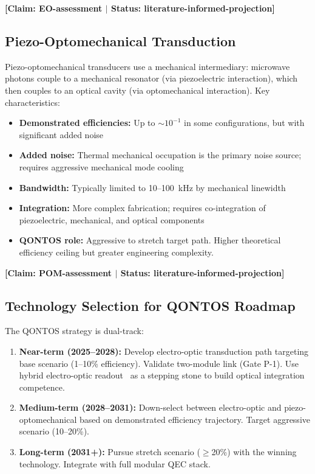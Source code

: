 \documentclass[conference]{IEEEtran}
\begin{document}
\textbf{[Claim: EO-assessment $|$ Status: literature-informed-projection]}

\subsection{Piezo-Optomechanical Transduction}

Piezo-optomechanical transducers use a mechanical intermediary: microwave photons couple to a mechanical resonator (via piezoelectric interaction), which then couples to an optical cavity (via optomechanical interaction). Key characteristics:

\begin{itemize}
\item \textbf{Demonstrated efficiencies:} Up to $\sim$$10^{-1}$ in some configurations, but with significant added noise~\cite{Lauk2020}
\item \textbf{Added noise:} Thermal mechanical occupation is the primary noise source; requires aggressive mechanical mode cooling
\item \textbf{Bandwidth:} Typically limited to 10--100~kHz by mechanical linewidth
\item \textbf{Integration:} More complex fabrication; requires co-integration of piezoelectric, mechanical, and optical components
\item \textbf{QONTOS role:} Aggressive to stretch target path. Higher theoretical efficiency ceiling but greater engineering complexity.
\end{itemize}

\textbf{[Claim: POM-assessment $|$ Status: literature-informed-projection]}

\subsection{Technology Selection for QONTOS Roadmap}

The QONTOS strategy is dual-track:

\begin{enumerate}
\item \textbf{Near-term (2025--2028):} Develop electro-optic transduction path targeting base scenario (1--10\% efficiency). Validate two-module link (Gate P-1). Use hybrid electro-optic readout~\cite{Lecocq2021, Delaney2022} as a stepping stone to build optical integration competence.
\item \textbf{Medium-term (2028--2031):} Down-select between electro-optic and piezo-optomechanical based on demonstrated efficiency trajectory. Target aggressive scenario (10--20\%).
\item \textbf{Long-term (2031+):} Pursue stretch scenario ($\geq$20\%) with the winning technology. Integrate with full modular QEC stack.
\end{enumerate}
\end{document}
